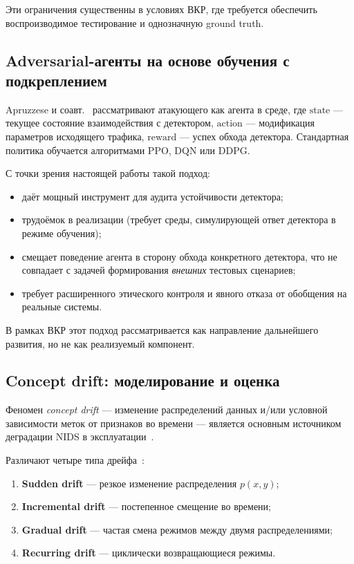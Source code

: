 Эти ограничения существенны в условиях ВКР, где требуется обеспечить
воспроизводимое тестирование и однозначную ground truth.

\subsection{Adversarial-агенты на основе обучения с подкреплением}

Apruzzese и соавт.~\cite{apruzzese2020adversarial} рассматривают атакующего
как агента в среде, где \(\text{state}\) --- текущее состояние
взаимодействия с детектором, \(\text{action}\) --- модификация параметров
исходящего трафика, \(\text{reward}\) --- успех обхода детектора.
Стандартная политика обучается алгоритмами PPO, DQN или DDPG.

С точки зрения настоящей работы такой подход:
\begin{itemize}
    \item даёт мощный инструмент для аудита устойчивости детектора;
    \item трудоёмок в реализации (требует среды, симулирующей ответ
    детектора в режиме обучения);
    \item смещает поведение агента в сторону обхода конкретного
    детектора, что не совпадает с задачей формирования \emph{внешних}
    тестовых сценариев;
    \item требует расширенного этического контроля и явного отказа от
    обобщения на реальные системы.
\end{itemize}

В рамках ВКР этот подход рассматривается как направление дальнейшего
развития, но не как реализуемый компонент.

\subsection{Concept drift: моделирование и оценка}

Феномен \emph{concept drift} --- изменение распределений данных и/или
условной зависимости меток от признаков во времени --- является основным
источником деградации NIDS в эксплуатации~\cite{gama2014drift,
pendlebury2019tesseract, andresini2021insomnia}.

Различают четыре типа дрейфа~\cite{gama2014drift}:
\begin{enumerate}
    \item \textbf{Sudden drift} --- резкое изменение распределения
    \(p(x, y)\);
    \item \textbf{Incremental drift} --- постепенное смещение во времени;
    \item \textbf{Gradual drift} --- частая смена режимов между двумя
    распределениями;
    \item \textbf{Recurring drift} --- циклически возвращающиеся режимы.
\end{enumerate}

